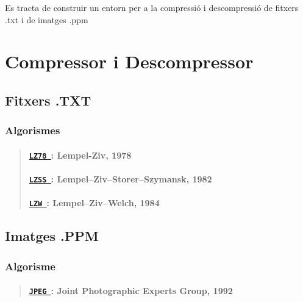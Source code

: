Es tracta de construir un entorn per a la compressió i descompressió de fitxers .txt i de imatges .ppm

\section*{Compressor i Descompressor}

\subsection*{Fitxers .T\+XT}

\subsubsection*{Algorismes}

\begin{quote}
\paragraph*{\href{./classdomini_1_1algorithm_1_1LZ78.html}{\tt L\+Z78 }\+: Lempel-\/\+Ziv, 1978}

\paragraph*{\href{./classdomini_1_1algorithm_1_1LZSS.html}{\tt L\+Z\+SS }\+: Lempel–\+Ziv–\+Storer–\+Szymansk, 1982}

\paragraph*{\href{./classdomini_1_1algorithm_1_1LZW.html}{\tt L\+ZW }\+: Lempel–\+Ziv–\+Welch, 1984}

\end{quote}
\subsection*{Imatges .P\+PM}

\subsubsection*{Algorisme}

\begin{quote}
\paragraph*{\href{./classdomini_1_1algorithm_1_1JPEG.html}{\tt J\+P\+EG }\+: Joint Photographic Experts Group, 1992}

\end{quote}
~\newline


